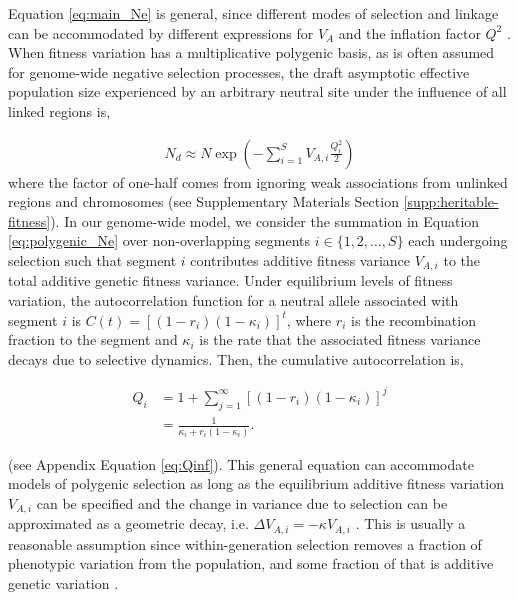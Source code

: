 \documentclass[11pt]{article}
\begin{document}
Equation \eqref{eq:main_Ne} is general, since different modes of selection and
linkage can be accommodated by different expressions for $V_A$ and the
inflation factor $Q^2$ \parencite{Santiago1995-hx,Santiago1998-bs}. When
fitness variation has a multiplicative polygenic basis, as is often assumed for
genome-wide negative selection processes, the draft asymptotic effective
population size experienced by an arbitrary neutral site under the influence of
all linked regions is,

\begin{align}
    \label{eq:polygenic_Ne}
    N_d \approx N \exp\left(-\sum_{i=1}^S V_{A,i} \frac{Q_i^2}{2}\right)
\end{align}
%
where the factor of one-half comes from ignoring weak associations from
unlinked regions and chromosomes (see Supplementary Materials Section
\ref{supp:heritable-fitness}). In our genome-wide model, we consider the
summation in Equation \eqref{eq:polygenic_Ne} over non-overlapping segments $i
\in \{1, 2, \ldots, S\}$ each undergoing selection such that segment $i$
contributes additive fitness variance $V_{A,i}$ to the total additive genetic
fitness variance. Under equilibrium levels of fitness variation, the
autocorrelation function for a neutral allele associated with segment $i$ is
$C(t) = [(1-r_i)(1-\kappa_i)]^t$, where $r_i$ is the recombination fraction to
the segment and $\kappa_i$ is the rate that the associated fitness variance
decays due to selective dynamics. Then, the cumulative autocorrelation is,

\begin{align}
    \label{eq:Q}
    Q_i &= 1 + \sum_{j=1}^\infty \left[(1-r_i)(1-\kappa_i)\right]^j \nonumber \\
        &= \frac{1}{\kappa_i + r_i(1-\kappa_i)}.
\end{align}

(see Appendix Equation \ref{eq:Qinf}). This general equation can accommodate
models of polygenic selection as long as the equilibrium additive fitness
variation $V_{A,i}$ can be specified and the change in variance due to
selection can be approximated as a geometric decay, i.e. $\Delta V_{A,i} =
-\kappa V_{A,i}$ \parencite{Bulmer1971-ae,Keightley1988-eq,Walsh2018-bt}. This
is usually a reasonable assumption since within-generation selection removes a
fraction of phenotypic variation from the population, and some fraction of that
is additive genetic variation \parencite{Bulmer1971-ae,Keightley1988-eq}.
\end{document}
